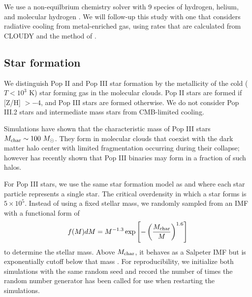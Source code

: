 \documentclass[apjl]{emulateapj}
\begin{document}
We use a non-equilbrium chemistry solver with 9 species of hydrogen,
helium, and molecular hydrogen \citep{Abel97}.  We will follow-up this
study with one that considers radiative cooling from metal-enriched
gas, using rates that are calculated from CLOUDY \citep{CLOUDY} and
the method of \citet{2008MNRAS.385.1443S}.


\subsection{Star formation}

We distinguish Pop II and Pop III star formation by the metallicity of
the cold ($T < 10^3$ K) star forming gas in the molecular clouds.  Pop
II stars are formed if [Z/H] $> -4$, and Pop III stars are formed
otherwise.  We do not consider Pop III.2 stars and intermediate mass
stars from CMB-limited cooling.

Simulations have shown that the characteristic mass of Pop III stars
$M_{\rm char} \sim 100~\Ms$.  They form in molecular clouds that
coexist with the dark matter halo center with limited fragmentation
occurring during their collapse; however \citet{2009Sci...325..601T}
has recently shown that Pop III binaries may form in a fraction of
such halos.  


For Pop III stars, we use the same star formation model as
\citet{Abel07} and \citet{Wise08_Gal} where each star particle
represents a single star.  The critical overdensity in which a star
forms is $5 \times 10^5$.  Instead of using a fixed stellar mass, we
randomly sampled from an IMF with a functional form of
%
\begin{equation}
\label{eqn:imf}
f(M)dM = M^{-1.3} \exp\left[-\left(\frac{M_{\rm char}}{M}\right)^{1.6}\right]
\end{equation}
to determine the stellar mass.  Above $M_{\rm char}$, it behaves as a
Salpeter IMF but is exponentially cutoff below that mass
\citep{Chabrier03, Clark09}.  For reproducibility, we initialize both
simulations with the same random seed and record the number of times
the random number generator \citep[Mersenne twister;][]{MTwister} has
been called for use when restarting the simulations.
\end{document}
